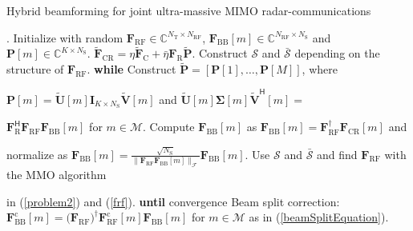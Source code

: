 \documentclass[journal,10pt]{IEEEtran}
\begin{document}
	
	\begin{algorithm}[t]
		{\color{black}
			\begin{algorithmic}[1]
				\caption{Hybrid beamforming for joint ultra-massive MIMO radar-communications}
				.
				\label{alg:CSI}
				\State Initialize with random $\mathbf{F}_\mathrm{RF}\in \mathbb{C}^{N_\mathrm{T}\times N_\mathrm{RF}}$, $\mathbf{F}_\mathrm{BB}[m]\in \mathbb{C}^{N_\mathrm{RF}\times N_\mathrm{S}}$ and $\mathbf{P}[m]\in \mathbb{C}^{K\times N_\mathrm{S}}$.
				\State $\widetilde{\mathbf{F}}_\mathrm{CR} = \eta\widetilde{\mathbf{F}}_\mathrm{C}  + \bar{\eta} \mathbf{F}_\mathrm{R}\widetilde{\mathbf{P}}$.
				\State Construct $\mathcal{S}$ and $\bar{\mathcal{S}}$ depending on the structure of $\mathbf{F}_\mathrm{RF}$.
				\State \textbf{while}
				\State \indent Construct $\widetilde{\mathbf{P}} = [\mathbf{P}[1],\dots, \mathbf{P}[M]]$, where \par \indent 
				$\mathbf{P}[m] = \widetilde{\mathbf{U}}[m] \mathbf{I}_{K\times N_\mathrm{S}}\widetilde{\mathbf{V}}[m]$ and  $\widetilde{\mathbf{U}}[m] \boldsymbol{\Sigma}[m]\widetilde{\mathbf{V}}^\textsf{H}[m] =$ \par \indent $ \mathbf{F}_\mathrm{R}^\textsf{H}\mathbf{F}_\mathrm{RF}\mathbf{F}_\mathrm{BB}[m]$ for $ m \in \mathcal{M}$.
				\State \indent Compute $\mathbf{F}_\mathrm{BB}[m]$ as $\mathbf{F}_\mathrm{BB}[m] = \mathbf{F}_\mathrm{RF}^\dagger \mathbf{F}_\mathrm{CR}[m]$ and  \par \indent normalize as  $\mathbf{F}_\mathrm{BB}[m] = \frac{\sqrt{N_\mathrm{S}}}{\| \mathbf{F}_\mathrm{RF}\mathbf{F}_\mathrm{BB}[m]\|_\mathcal{F}}\mathbf{F}_\mathrm{BB}[m]$.
				\State \indent Use  $\mathcal{S}$ and $\bar{\mathcal{S}}$ and find $\mathbf{F}_\mathrm{RF}$ with the MMO algorithm \par \indent in (\ref{problem2}) and (\ref{frf}).
				\State \textbf{until} convergence
				\State Beam split correction: $	{\mathbf{F}}_\mathrm{BB}^\mathrm{c}[m] = \big({\mathbf{F}}_\mathrm{RF}\big)^\dagger  {\mathbf{F}}_\mathrm{RF}^\mathrm{c}[m] {\mathbf{F}}_\mathrm{BB}[m]$ for $m\in \mathcal{M}$ as in (\ref{beamSplitEquation}).
			\end{algorithmic}
		}
	\end{algorithm}
	
\end{document}
